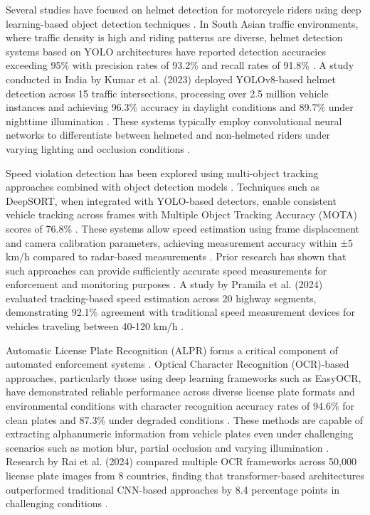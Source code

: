 \documentclass[12pt, a4paper, oneside]{memoir}
\begin{document}
Several studies have focused on helmet detection for motorcycle riders using deep learning-based object detection techniques \cite{patil2024traffic}. In South Asian traffic environments, where traffic density is high and riding patterns are diverse, helmet detection systems based on YOLO architectures have reported detection accuracies exceeding 95\% with precision rates of 93.2\% and recall rates of 91.8\% \cite{ijarcce2026}. A study conducted in India by Kumar et al. (2023) deployed YOLOv8-based helmet detection across 15 traffic intersections, processing over 2.5 million vehicle instances and achieving 96.3\% accuracy in daylight conditions and 89.7\% under nighttime illumination \cite{kumar2023helmet}. These systems typically employ convolutional neural networks to differentiate between helmeted and non-helmeted riders under varying lighting and occlusion conditions \cite{patil2024traffic}.

Speed violation detection has been explored using multi-object tracking approaches combined with object detection models \cite{pramila2024speed}. Techniques such as DeepSORT, when integrated with YOLO-based detectors, enable consistent vehicle tracking across frames with Multiple Object Tracking Accuracy (MOTA) scores of 76.8\% \cite{ijarcce2026}. These systems allow speed estimation using frame displacement and camera calibration parameters, achieving measurement accuracy within ±5 km/h compared to radar-based measurements \cite{pramila2024speed}. Prior research has shown that such approaches can provide sufficiently accurate speed measurements for enforcement and monitoring purposes \cite{pramila2024speed}. A study by Pramila et al. (2024) evaluated tracking-based speed estimation across 20 highway segments, demonstrating 92.1\% agreement with traditional speed measurement devices for vehicles traveling between 40-120 km/h \cite{pramila2024speed}.

Automatic License Plate Recognition (ALPR) forms a critical component of automated enforcement systems \cite{np_alpr2023}. Optical Character Recognition (OCR)-based approaches, particularly those using deep learning frameworks such as EasyOCR, have demonstrated reliable performance across diverse license plate formats and environmental conditions with character recognition accuracy rates of 94.6\% for clean plates and 87.3\% under degraded conditions \cite{rai2024ocr}. These methods are capable of extracting alphanumeric information from vehicle plates even under challenging scenarios such as motion blur, partial occlusion and varying illumination \cite{patil2024traffic}. Research by Rai et al. (2024) compared multiple OCR frameworks across 50,000 license plate images from 8 countries, finding that transformer-based architectures outperformed traditional CNN-based approaches by 8.4 percentage points in challenging conditions \cite{rai2024ocr}.
\end{document}
